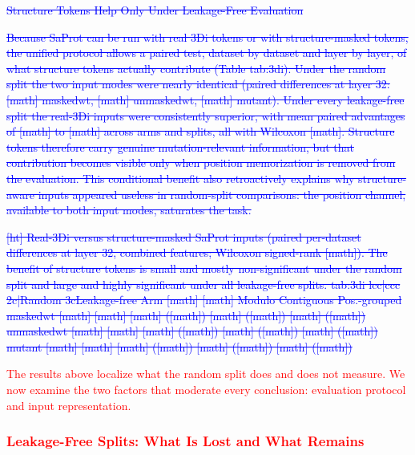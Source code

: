 \documentclass[11pt,a4paper]{article}
\newcommand{\rev}[1]{\textcolor{red}{#1}}
\begin{document}
\textcolor{blue}{\sout{Structure Tokens Help Only Under Leakage-Free Evaluation}}

\textcolor{blue}{\sout{Because SaProt can be run with real 3Di tokens or with structure-masked
tokens, the unified protocol allows a paired test, dataset by dataset and layer by
layer, of what structure tokens actually contribute (Table tab:3di). Under the
random split the two input modes were nearly identical (paired differences at layer
32: [math] maskedwt, [math] unmaskedwt, [math] mutant). Under every
leakage-free split the real-3Di inputs were consistently superior, with mean paired
advantages of [math] to [math] across arms and splits, all with Wilcoxon
[math]. Structure tokens therefore carry genuine mutation-relevant
information, but that contribution becomes visible only when position memorization
is removed from the evaluation. This conditional benefit also retroactively
explains why structure-aware inputs appeared useless in random-split comparisons:
the position channel, available to both input modes, saturates the task.}}

\textcolor{blue}{\sout{[ht]
Real-3Di versus structure-masked SaProt inputs (paired per-dataset
differences at layer 32, combined features; Wilcoxon signed-rank [math]). The benefit of
structure tokens is small and mostly non-significant under the random split and
large and highly significant under all leakage-free splits.
tab:3di
lcc|ccc
 2c|Random 3cLeakage-free 
Arm [math] [math] Modulo Contiguous Pos.-grouped 
maskedwt [math] [math] [math] ([math]) [math] ([math]) [math] ([math]) 
unmaskedwt [math] [math] [math] ([math]) [math] ([math]) [math] ([math]) 
mutant [math] [math] [math] ([math]) [math] ([math]) [math] ([math])}}

\textcolor{red}{\rev{The results above localize what the random split does and does not
measure. We now examine the two factors that moderate every conclusion:
evaluation protocol and input representation.}}

\textcolor{red}{\subsubsection{\rev{Leakage-Free Splits: What Is Lost and What Remains}}}
\end{document}
